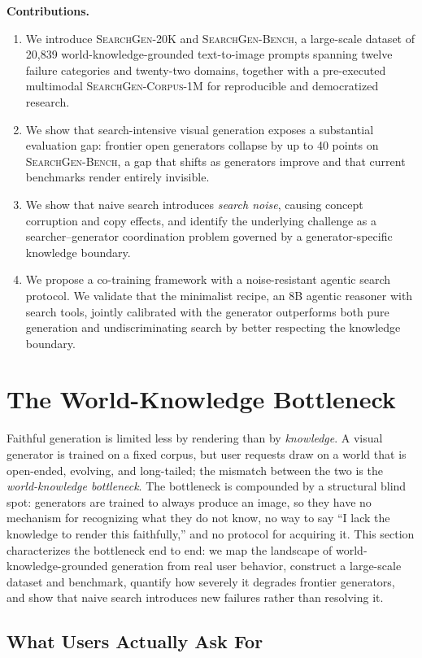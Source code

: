 \documentclass{article}
\newcommand{\bench}{\textsc{SearchGen-Bench}}
\newcommand{\dataset}{\textsc{SearchGen-20K}}
\newcommand{\searchcorpus}{\textsc{SearchGen-Corpus-1M}}
\begin{document}
\textbf{Contributions.}
\begin{enumerate}[leftmargin=*,itemsep=2pt]
\item We introduce \dataset{} and \bench{}, a large-scale dataset of 20{,}839 world-knowledge-grounded text-to-image prompts spanning twelve failure categories and twenty-two domains, together with a pre-executed multimodal \searchcorpus{} for reproducible and democratized research.
\item We show that search-intensive visual generation exposes a substantial evaluation gap: frontier open generators collapse by up to 40 points on \bench{}, a gap that shifts as generators improve and that current benchmarks render entirely invisible.
\item We show that naive search introduces \emph{search noise}, causing concept corruption and copy effects, and identify the underlying challenge as a searcher--generator coordination problem governed by a generator-specific knowledge boundary.
\item We propose a co-training framework with a noise-resistant agentic search protocol. We validate that the minimalist recipe, an 8B agentic reasoner with search tools, jointly calibrated with the generator outperforms both pure generation and undiscriminating search by better respecting the knowledge boundary.
\end{enumerate}


\section{The World-Knowledge Bottleneck}
\label{sec:benchmark}
Faithful generation is limited less by rendering than by \emph{knowledge}. A visual generator is trained on a fixed corpus, but user requests draw on a world that is open-ended, evolving, and long-tailed; the mismatch between the two is the \emph{world-knowledge bottleneck}. The bottleneck is compounded by a structural blind spot: generators are trained to always produce an image, so they have no mechanism for recognizing what they do not know, no way to say ``I lack the knowledge to render this faithfully,'' and no protocol for acquiring it. This section characterizes the bottleneck end to end: we map the landscape of world-knowledge-grounded generation from real user behavior, construct a large-scale dataset and benchmark, quantify how severely it degrades frontier generators, and show that naive search introduces new failures rather than resolving it.

\subsection{What Users Actually Ask For} %
\label{sec:taxonomy}
\end{document}
